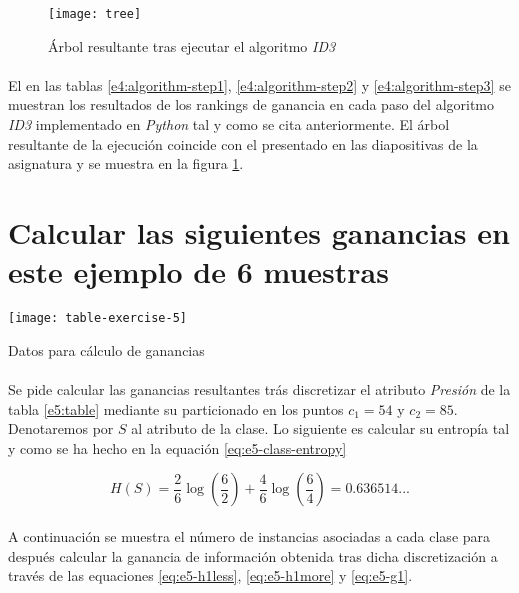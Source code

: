 \documentclass[10pt, a4paper,spanish]{article}
\begin{document}
		\begin{figure}[h]
			\begin{center}
				\texttt{[image: tree]}
			\end{center}
			\caption{Árbol resultante tras ejecutar el algoritmo \emph{ID3} \cite{subject:taa}}
			\label{e4:tree}
		\end{figure}

		\paragraph{}
		El en las tablas \ref{e4:algorithm-step1}, \ref{e4:algorithm-step2} y \ref{e4:algorithm-step3} se muestran los resultados de los rankings de ganancia en cada paso del algoritmo \emph{ID3} implementado en \emph{Python} tal y como se cita anteriormente. El árbol resultante de la ejecución coincide con el presentado en las diapositivas de la asignatura \cite{subject:taa} y se muestra en la figura \ref{e4:tree}.



	\section{Calcular las siguientes ganancias en este ejemplo de 6 muestras}
	\label{e5}

		\begin{table}[h]
			\begin{center}
				\texttt{[image: table-exercise-5]}
			\end{center}
			\caption{Datos para cálculo de ganancias}
			\label{e5:table}
		\end{table}

		\paragraph{}
		Se pide calcular las ganancias resultantes trás discretizar el atributo \emph{Presión} de la tabla \ref{e5:table} mediante su particionado en los puntos $c_1 = 54$ y $c_2 = 85$. Denotaremos por $S$ al atributo de la clase. Lo siguiente es calcular su entropía tal y como se ha hecho en la equación \eqref{eq:e5-class-entropy}

		\begin{equation}
			\label{eq:e5-class-entropy}
			H(S) = \frac{2}{6}\log(\frac{6}{2}) + \frac{4}{6}\log(\frac{6}{4}) = 0.636514...
		\end{equation}

		\paragraph{}
		A continuación se muestra el número de instancias asociadas a cada clase para después calcular la ganancia de información obtenida tras dicha discretización a través de las equaciones \eqref{eq:e5-h1less},  \eqref{eq:e5-h1more} y \eqref{eq:e5-g1}.
\end{document}
